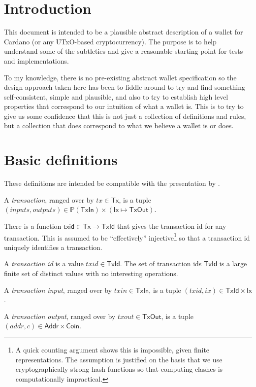 \documentclass{article}
\newcommand{\powerset}[1]{\mathbb{P}(#1)}
\begin{document}
\section{Introduction}

This document is intended to be a plausible abstract description of a wallet
for Cardano (or any UTxO-based cryptocurrency). The purpose is to help
understand some of the subtleties and give a reasonable starting point for
tests and implementations.

To my knowledge, there is no pre-existing abstract wallet specification so the
design approach taken here has been to fiddle around to try and find something
self-consistent, simple and plausible, and also to try to establish high level
properties that correspond to our intuition of what a wallet is. This is to try
to give us some confidence that this is not just a collection of definitions
and rules, but a collection that does correspond to what we believe a wallet is
or does.

\section{Basic definitions}

These definitions are intended be compatible with the presentation by
\cite{utxo_accounting}.

A \emph{transaction}, ranged over by $tx \in \mathsf{Tx}$, is a tuple
$(inputs, outputs)
   \in \powerset{\mathsf{TxIn}}
   \times (\mathsf{Ix} \mapsto \mathsf{TxOut})$.

There is a function $\mathsf{txid} \in \mathsf{Tx} \to \mathsf{TxId}$ that gives
the transaction id for any transaction. This is assumed to be ``effectively''
injective\footnote{A quick counting argument shows this is impossible, given
finite representations. The assumption is justified on the basis that we use
cryptographically strong hash functions so that computing clashes is
computationally impractical.} so that a transaction id uniquely identifies a
transaction.

A \emph{transaction id} is a value $txid \in \mathsf{TxId}$. The set of
transaction ids $\mathsf{TxId}$ is a large finite set of distinct values with
no interesting operations.

A \emph{transaction input}, ranged over by $txin \in \mathsf{TxIn}$, is a tuple
$(txid, ix) \in \mathsf{TxId} \times \mathsf{Ix}$.

A \emph{transaction output}, ranged over by $txout \in \mathsf{TxOut}$, is a tuple
$(addr, c) \in \mathsf{Addr} \times \mathsf{Coin}$.
\end{document}
